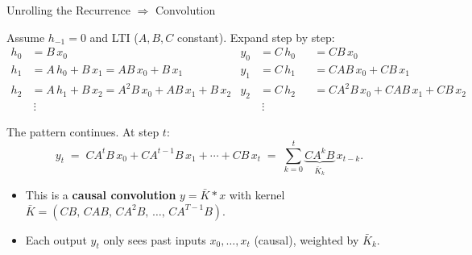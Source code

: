 \begin{frame}{Unrolling the Recurrence $\Rightarrow$ Convolution}

  Assume $h_{-1} = 0$ and LTI ($A, B, C$ constant). Expand step by step:
  \begin{align*}
    h_0 &= B\,x_0
      & y_0 &= C\,h_0 &&= C B\,x_0 \\
    h_1 &= A\,h_0 + B\,x_1 = A B\,x_0 + B\,x_1
      & y_1 &= C\,h_1 &&= C A B\,x_0 + C B\,x_1 \\
    h_2 &= A\,h_1 + B\,x_2 = A^2 B\,x_0 + A B\,x_1 + B\,x_2
      & y_2 &= C\,h_2 &&= C A^2 B\,x_0 + C A B\,x_1 + C B\,x_2 \\
    &\ \vdots & &\ \vdots
  \end{align*}

  The pattern continues. At step $t$:
  \[
    y_t \;=\; C A^t B\, x_0 + C A^{t-1} B\, x_1 + \cdots + C B\, x_t
    \;=\; \sum_{k=0}^{t} \underbrace{C A^k B}_{\bar{K}_k}\, x_{t-k}.
  \]

  \begin{itemize}
    \item This is a \textbf{causal convolution} $y = \bar{K} \ast x$ with kernel $\bar{K} = (C B,\, C A B,\, C A^2 B,\, \ldots,\, C A^{T-1} B)$.
    \item Each output $y_t$ only sees past inputs $x_0, \ldots, x_t$ (causal), weighted by $\bar{K}_k$.
  \end{itemize}
\end{frame}

